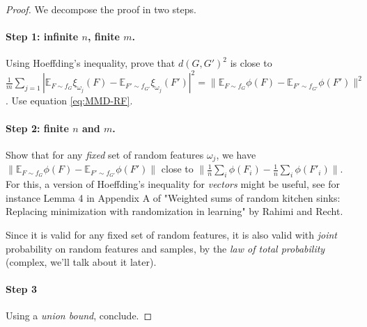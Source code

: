 \documentclass{article}
\begin{document}
\begin{proof}
We decompose the proof in two steps.
\paragraph{Step 1: infinite $n$, finite $m$.} Using Hoeffding's inequality, prove that $d(G, G')^2$ is close to $\frac{1}{m} \sum_{j=1} | \mathbb{E}_{F \sim f_G} \xi_{\omega_j}(F) - \mathbb{E}_{F' \sim f_{G'}} \xi_{\omega_j}(F') |^2 = \| \mathbb{E}_{F \sim f_G} \phi(F) - \mathbb{E}_{F' \sim f_{G'}} \phi(F')\|^2$. Use equation \eqref{eq:MMD-RF}.

\paragraph{Step 2: finite $n$ and $m$.} Show that for any \emph{fixed} set of random features $\omega_j$, we have $\| \mathbb{E}_{F \sim f_G} \phi(F) - \mathbb{E}_{F' \sim f_{G'}} \phi(F')\|$ close to $\| \frac{1}{n} \sum_i \phi(F_i) - \frac{1}{n} \sum_i \phi(F'_i)\|$. For this, a version of Hoeffding's inequality for \emph{vectors} might be useful, see for instance Lemma 4 in Appendix A of "Weighted sums of random kitchen sinks: Replacing minimization with randomization in learning" by Rahimi and Recht.

Since it is valid for any fixed set of random features, it is also valid with \emph{joint} probability on random features and samples, by the \emph{law of total probability} (complex, we'll talk about it later).

\paragraph{Step 3} Using a \emph{union bound}, conclude.

\end{proof}

%
\end{document}
